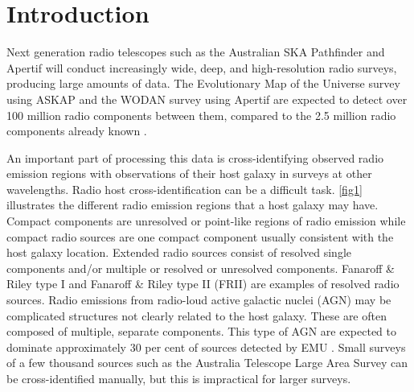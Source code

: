 \documentclass[fleqn,usenatbib,usedcolumn]{mnras}
\begin{document}

\section{Introduction}\label{introduction}

  Next generation radio telescopes such as the Australian SKA Pathfinder
  \citep[ASKAP;][]{johnston07} and Apertif \citep{verheijen08} will conduct
  increasingly wide, deep, and high-resolution radio surveys, producing large
  amounts of data. The Evolutionary Map of the Universe survey
  \citep[EMU;][]{norris11} using ASKAP and the WODAN survey
  \citep{rottgering11} using Apertif are expected to detect over 100 million
  radio components between them, compared to the 2.5 million radio components
  already known \citep{banfield15}.

  An important part of processing this data is cross-identifying observed
  radio emission regions with observations of their host galaxy in surveys at
  other wavelengths. Radio host cross-identification can be a difficult task.
  \autoref{fig1} illustrates the different radio emission regions that a host
  galaxy may have. Compact components are unresolved or point-like regions of
  radio emission while compact radio sources are one compact component usually
  consistent with the host galaxy location. Extended radio sources consist of
  resolved single components and/or multiple or resolved or unresolved
  components. Fanaroff \& Riley type I \citep[FRI; ][]{Fanaroff1974} and
  Fanaroff \& Riley type II (FRII) are examples of resolved radio sources.
  Radio emissions from radio-loud active galactic nuclei (AGN) may be
  complicated structures not clearly related to the host galaxy. These are
  often composed of multiple, separate components. This type of AGN are
  expected to dominate approximately 30 per cent of sources detected by EMU
  \citep{norris11}. Small surveys of a few thousand sources such as the
  Australia Telescope Large Area Survey
  \citep[ATLAS;][]{norris06,middelberg08} can be cross-identified manually,
  but this is impractical for larger surveys.
\end{document}
